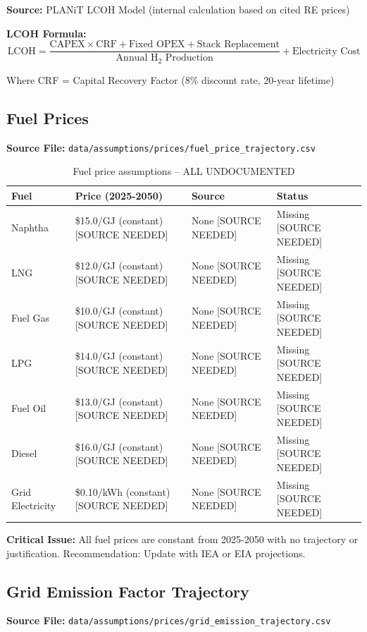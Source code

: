 \documentclass[12pt,a4paper]{article}
\newcommand{\nosource}[1]{\textcolor{sourcered}{#1 [SOURCE NEEDED]}}
\begin{document}
\textbf{Source:} PLANiT LCOH Model (internal calculation based on cited RE prices)

\textbf{LCOH Formula:}
\begin{equation}
\text{LCOH} = \frac{\text{CAPEX} \times \text{CRF} + \text{Fixed OPEX} + \text{Stack Replacement}}{\text{Annual H}_2\text{ Production}} + \text{Electricity Cost}
\end{equation}

Where CRF = Capital Recovery Factor (8\% discount rate, 20-year lifetime)

\subsection{Fuel Prices}
\textbf{Source File:} \texttt{data/assumptions/prices/fuel\_price\_trajectory.csv}

\begin{table}[H]
\centering
\begin{tabular}{llll}
\toprule
\textbf{Fuel} & \textbf{Price (2025-2050)} & \textbf{Source} & \textbf{Status} \\
\midrule
Naphtha & \nosource{\$15.0/GJ (constant)} & \nosource{None} & \nosource{Missing} \\
LNG & \nosource{\$12.0/GJ (constant)} & \nosource{None} & \nosource{Missing} \\
Fuel Gas & \nosource{\$10.0/GJ (constant)} & \nosource{None} & \nosource{Missing} \\
LPG & \nosource{\$14.0/GJ (constant)} & \nosource{None} & \nosource{Missing} \\
Fuel Oil & \nosource{\$13.0/GJ (constant)} & \nosource{None} & \nosource{Missing} \\
Diesel & \nosource{\$16.0/GJ (constant)} & \nosource{None} & \nosource{Missing} \\
Grid Electricity & \nosource{\$0.10/kWh (constant)} & \nosource{None} & \nosource{Missing} \\
\bottomrule
\end{tabular}
\caption{Fuel price assumptions -- \textcolor{sourcered}{ALL UNDOCUMENTED}}
\end{table}

\textbf{Critical Issue:} All fuel prices are constant from 2025-2050 with no trajectory or justification. Recommendation: Update with IEA or EIA projections.

\subsection{Grid Emission Factor Trajectory}
\textbf{Source File:} \texttt{data/assumptions/prices/grid\_emission\_trajectory.csv}
\end{document}
